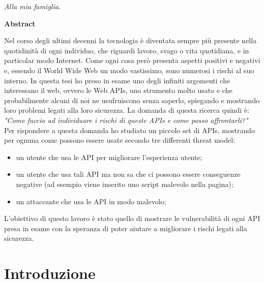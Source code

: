 \documentclass[11pt ,a4paper , twoside , openright ]{book}
\begin{document}
	\cleardoublepage
	\thispagestyle{empty}
	\begin{flushright}
		\vspace*{3.0cm}\textit{Alla mia famiglia.}
	\end{flushright}
	\cleardoublepage
	\begin{center}
		\textbf{Abstract}
	\end{center}
	\begin{flushleft}
		Nel corso degli ultimi decenni la tecnologia è diventata sempre più presente nella quotidinità di ogni individuo, che riguardi lavoro, svago o vita quotidiana, e in particolar modo Internet.
		Come ogni cosa però presenta aspetti positivi e negativi e, essendo il World Wide Web un modo vastissimo, sono numerosi i rischi al suo interno.
		In questa tesi ho preso in esame uno degli infiniti argomenti che interessano il web, ovvero le Web APIs, uno strumento molto usato e che probabilmente alcuni di noi ne usufruiscono senza saperlo, spiegando e mostrando loro problemi legati alla loro sicurezza. La domanda di questa ricerca quindi è: \textit{"Come faccio ad individuare i rischi di queste APIs e come posso affrontarli?"}
		Per rispondere a questa domanda ho studiato un piccolo set di APIs, mostrando per ognuna come possono essere usate secondo tre differenti threat model: 
		\begin{itemize}
			\item un utente che usa le API per migliorare l'esperienza utente;
			\item un utente che usa tali API ma non sa che ci possono essere conseguenze negative (ad esempio viene inserito uno script malevolo nella pagina);
			\item un attaccante che usa le API in modo malevolo;
		\end{itemize}
		L'obiettivo di questo lavoro è stato quello di mostrare le vulnerabilità di ogni API presa in esame con la speranza di poter aiutare a migliorare i rischi legati alla sicurezza.	
	\end{flushleft}
	\cleardoublepage
	\dominitoc
	\tableofcontents

	\cleardoublepage
	\chapter{Introduzione}
	
\end{document}
